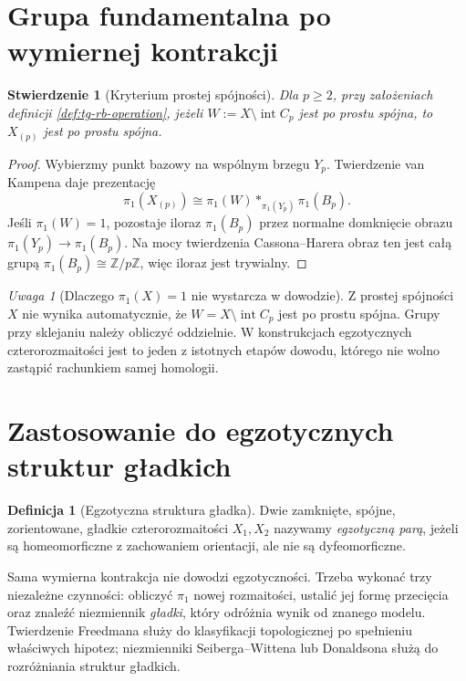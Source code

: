 \documentclass[11pt,a4paper]{report}
\numberwithin{equation}{section}
\theoremstyle{plain}
\newtheorem{stwierdzenie}[twierdzenie]{Stwierdzenie}
\theoremstyle{definition}
\newtheorem{definicja}[twierdzenie]{Definicja}
\theoremstyle{remark}
\newtheorem{uwaga}[twierdzenie]{Uwaga}
\begin{document}
\section{Grupa fundamentalna po wymiernej kontrakcji}
\label{sec:tg-rb-pi1}

\begin{stwierdzenie}[Kryterium prostej spójności]
\label{prop:tg-rb-pi1}
Dla $p\geq2$, przy założeniach definicji
\ref{def:tg-rb-operation},
jeżeli $W:=X\setminus\operatorname{int}C_p$ jest
po prostu spójna, to $X_{(p)}$ jest po prostu spójna.
\end{stwierdzenie}

\begin{proof}
Wybierzmy punkt bazowy na wspólnym brzegu $Y_p$.
Twierdzenie van Kampena daje prezentację
\[
\pi_1(X_{(p)})\cong\pi_1(W)*_{\pi_1(Y_p)}\pi_1(B_p).
\]
Jeśli $\pi_1(W)=1$, pozostaje iloraz
$\pi_1(B_p)$ przez normalne domknięcie obrazu
$\pi_1(Y_p)\to\pi_1(B_p)$. Na mocy twierdzenia
Cassona--Harera obraz ten jest całą grupą
$\pi_1(B_p)\cong\mathbb Z/p\mathbb Z$,
więc iloraz jest trywialny.
\end{proof}

\begin{uwaga}[Dlaczego $\pi_1(X)=1$ nie wystarcza w dowodzie]
Z prostej spójności $X$ nie wynika automatycznie,
że $W=X\setminus\operatorname{int}C_p$ jest po prostu
spójna. Grupy przy sklejaniu należy obliczyć oddzielnie.
W konstrukcjach egzotycznych czterorozmaitości
jest to jeden z istotnych etapów dowodu, którego
nie wolno zastąpić rachunkiem samej homologii.
\end{uwaga}

\section{Zastosowanie do egzotycznych struktur gładkich}
\label{sec:tg-rb-exotic}

\begin{definicja}[Egzotyczna struktura gładka]
Dwie zamknięte, spójne, zorientowane, gładkie
czterorozmaitości $X_1,X_2$ nazywamy
\emph{egzotyczną parą}, jeżeli są homeomorficzne
z zachowaniem orientacji, ale nie są dyfeomorficzne.
\end{definicja}

Sama wymierna kontrakcja nie dowodzi egzotyczności.
Trzeba wykonać trzy niezależne czynności:
obliczyć $\pi_1$ nowej rozmaitości, ustalić
jej formę przecięcia oraz znaleźć niezmiennik
\emph{gładki}, który odróżnia wynik od znanego modelu.
Twierdzenie Freedmana służy do klasyfikacji
topologicznej po spełnieniu właściwych hipotez;
niezmienniki Seiberga--Wittena lub Donaldsona
służą do rozróżniania struktur gładkich.
\end{document}
